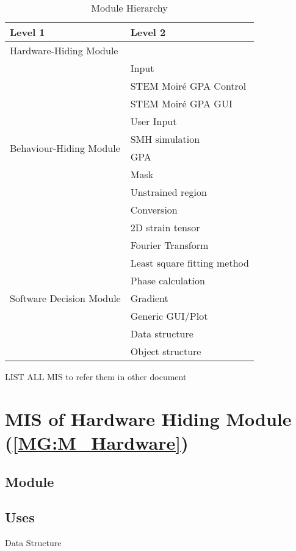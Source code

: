 \documentclass[12pt, titlepage]{article}
\newcommand{\progname}{STEM Moir{\'e} GPA}
\begin{document}
\begin{table}[H]
\centering
\begin{tabular}{p{} p{}}
\toprule
\textbf{Level 1} & \textbf{Level 2}\\
\midrule

{Hardware-Hiding Module} & ~ \\
\midrule

\multirow{10}{0.3\textwidth}{Behaviour-Hiding Module} & Input\\
& \progname{} Control \\
& \progname{} GUI \\
& User Input \\
& SMH simulation \\
& GPA \\
& Mask \\
& Unstrained region \\
& Conversion \\
& 2D strain tensor \\
\midrule

\multirow{7}{0.3\textwidth}{Software Decision Module} & Fourier Transform \\
& Least square fitting method \\
& Phase calculation \\
& Gradient \\
& Generic GUI/Plot \\
& Data structure \\
& Object structure \\
\bottomrule

\end{tabular}
\caption{Module Hierarchy}
\label{TblMH}
\end{table}

LIST ALL MIS to refer them in other document

\newpage

\section{MIS of Hardware Hiding Module (\texorpdfstring{\cref{MG:M_Hardware}}))} \label{MIS_Hardware}

\subsection{Module}


\subsection{Uses}
Data Structure
\end{document}
